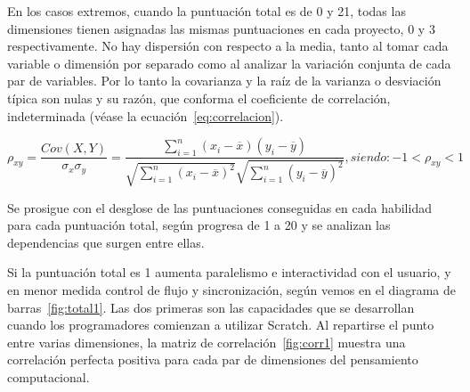 \documentclass[a4paper, 12pt]{book}
\begin{document}
En los casos extremos, cuando la puntuación total es de 0 y 21, todas las dimensiones tienen asignadas las mismas puntuaciones en cada proyecto, 0 y 3 respectivamente. No hay dispersión con respecto a la media, tanto al tomar cada variable o dimensión por separado como al analizar la variación conjunta de cada par de variables. Por lo tanto la covarianza y la raíz de la varianza o desviación típica son nulas y su razón, que conforma el coeficiente de correlación, indeterminada (véase la ecuación~\eqref{eq:correlacion}). 

\begin{equation}
   \rho_{xy} = \dfrac{Cov(X,Y)}{\sigma_{x}\sigma_{y}} = \dfrac{\sum_{i=1}^{n} (x_i - \overline{x})(y_i - \overline{y})}{\sqrt{\sum_{i=1}^{n} (x_i - \overline{x})^{2}}\sqrt{\sum_{i=1}^{n} (y_i - \overline{y})^{2}}},  siendo: -1<\rho_{xy}<1
   \label{eq:correlacion}
\end{equation}   

Se prosigue con el desglose de las puntuaciones conseguidas en cada habilidad para cada puntuación total, según progresa de 1 a 20 y se analizan las dependencias que surgen entre ellas.

Si la puntuación total es 1 aumenta paralelismo e interactividad con el usuario, y en menor medida control de flujo y sincronización, según vemos en el diagrama de barras~\ref{fig:total1}. Las dos primeras son las capacidades que se desarrollan cuando los programadores comienzan a utilizar  Scratch. Al repartirse el punto entre varias dimensiones,
la matriz de correlación~\ref{fig:corr1} muestra una correlación perfecta positiva para cada par de dimensiones del pensamiento computacional.
\end{document}
